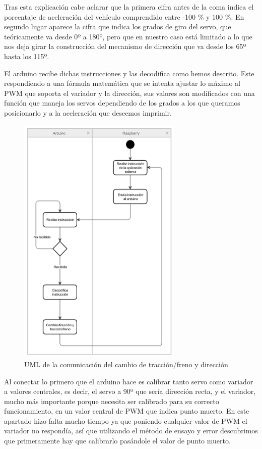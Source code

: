 \documentclass{pclass}
\begin{document}
\begin{itemize}
\begin{itemize}
	Tras esta explicación cabe aclarar que la primera cifra antes de la coma indica el porcentaje de aceleración del vehículo comprendido entre -100 \% y 100 \%. En segundo lugar aparece la cifra que indica los grados de giro del servo, que teóricamente va desde 0º a 180º, pero que en nuestro caso está limitado a lo que nos deja girar la construcción del mecanismo de dirección que va desde los 65º hasta los 115º.
	

	El arduino recibe dichas instrucciones y las decodifica como hemos descrito. Este respondiendo a una fórmula matemática que se intenta ajustar lo máximo al PWM que soporta el variador y la dirección, sus valores son modificados con una función que maneja los servos dependiendo de los grados a los que queramos posicionarlo y a la aceleración que deseemos imprimir.
	
	\begin{figure}[H]
		\centering
		\includegraphics[width=0.7\textwidth]{img/umlCambio}
		\caption{UML de la comunicación del cambio de tracción/freno y dirección}
		\label{fig:arduinoCambios}
	\end{figure}
	
	Al conectar lo primero que el arduino hace es calibrar tanto servo como variador a valores centrales, es decir, el servo a 90º que sería dirección recta, y el variador, mucho más importante porque necesita ser calibrado para su correcto funcionamiento, en un valor central de PWM que indica punto muerto. En este apartado hizo falta mucho tiempo ya que poniendo cualquier valor de PWM el variador no respondía, así que utilizando el método de ensayo y error descubrimos que primeramente hay que calibrarlo pasándole el valor de punto muerto.
	

\end{itemize}
\end{itemize}
\end{document}
